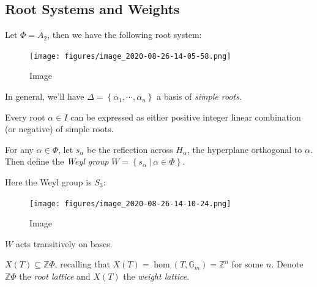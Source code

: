 \hypertarget{root-systems-and-weights}{%
\subsection{Root Systems and Weights}\label{root-systems-and-weights}}

\begin{example}

Let \(\Phi = A_2\), then we have the following root system:

\begin{figure}
\centering
\texttt{[image: figures/image\_2020-08-26-14-05-58.png]}
\caption{Image}
\end{figure}

\end{example}

In general, we'll have
\(\Delta = \left\{{\alpha_1, \cdots, \alpha_n}\right\}\) a basis of
\emph{simple roots}.

\begin{remark}

Every root \(\alpha\in I\) can be expressed as either positive integer
linear combination (or negative) of simple roots.

\end{remark}

For any \(\alpha\in \Phi\), let \(s_\alpha\) be the reflection across
\(H_\alpha\), the hyperplane orthogonal to \(\alpha\). Then define the
\emph{Weyl group}
\(W = \left\{{s_\alpha {~\mathrel{\Big|}~}\alpha\in \Phi}\right\}\).

\begin{example}

Here the Weyl group is \(S_3\):

\begin{figure}
\centering
\texttt{[image: figures/image\_2020-08-26-14-10-24.png]}
\caption{Image}
\end{figure}

\end{example}

\begin{remark}

\(W\) acts transitively on bases.

\end{remark}

\begin{remark}

\(X(T) \subseteq {\mathbb{Z}}\Phi\), recalling that
\(X(T) = \hom(T, {\mathbb{G}}_m) = {\mathbb{Z}}^n\) for some \(n\).
Denote \({\mathbb{Z}}\Phi\) the \emph{root lattice} and \(X(T)\) the
\emph{weight lattice}.

\end{remark}

